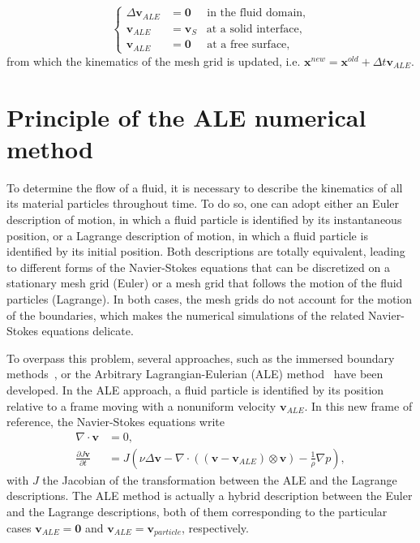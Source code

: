 \begin{equation}
  \left\{
\begin{aligned}
\Delta \mathbf{v}_{ALE} &= \mathbf{0} \;\;\;\;\; \text{in the fluid domain,}\\
\mathbf{v}_{ALE} &= \mathbf{v}_{S} \;\;\; \text{at a solid interface,}\\
\mathbf{v}_{ALE} &= \mathbf{0} \;\;\;\;\; \text{at a free surface,} 
\end{aligned}
\right.
\end{equation}
from which the kinematics of the mesh grid is updated, i.e. ${\textbf{x}}^{new}={\textbf{x}}^{old} + \Delta t{\textbf{v}}_{ALE}$.

\chapter{Principle of the ALE numerical method}
To determine the flow of a fluid, it is necessary to describe the kinematics of all its material particles throughout time. To do so, one can adopt either an Euler description of motion, in which a fluid particle is identified by its instantaneous position, or a Lagrange description of motion, in which a fluid particle is identified by its initial position. 
Both descriptions are totally equivalent, leading to different forms of the Navier-Stokes equations that can be discretized on a stationary mesh grid (Euler) or a mesh grid that follows the motion of the fluid particles (Lagrange). In both cases, the mesh grids do not account for the motion of the boundaries, which makes the numerical simulations of the related Navier-Stokes equations delicate. 

To overpass this problem, several approaches, such as the immersed boundary methods~\cite{puscas2015three, puscas2015time, puscas2015conservative}, or the Arbitrary Lagrangian-Eulerian (ALE) method~\cite{donea2004arbitrary, fourestey2004second, koobus2000computation} have been developed. 
In the ALE approach, a fluid particle is identified by its position relative to a frame moving with a nonuniform velocity ${\textbf{v}}_{ALE}$. In this new frame of reference, the Navier-Stokes equations write
\begin{subequations}\label{eq:NS_ALE2}
\begin{align}
\nabla \cdot   \textbf{v} &= 0, \\
\frac{\partial J {\textbf{v}}}{\partial t}  &=  J \left(\nu\Delta {\textbf{v}}   - \nabla \cdot  ( ({\textbf{v}} - {\textbf{v}}_{ALE}) \otimes {\textbf{v}} )  - \frac{1}{\rho}\nabla p\right),
\end{align}
\end{subequations}
with $J$ the Jacobian of the transformation between the ALE and the Lagrange descriptions. The ALE method is actually a hybrid description between the Euler and the Lagrange descriptions, both of them corresponding to the particular cases ${\textbf{v}}_{ALE}={\textbf{0}}$ and ${\textbf{v}}_{ALE}={\textbf{v}}_{particle}$, respectively. 

